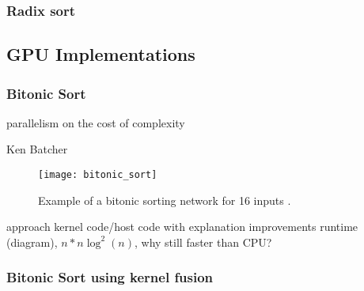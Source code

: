 \subsubsection{Radix sort}




\subsection{GPU Implementations}

\subsubsection{Bitonic Sort}
parallelism on the cost of complexity

Ken Batcher

\begin{figure}
\centering
\texttt{[image: bitonic\_sort]}
\caption{Example of a bitonic sorting network for 16 inputs \cite{wiki_bitonic_sort}.}
\label{fig:bitonic_sort}
\end{figure}

approach
kernel code/host code with explanation
improvements
runtime (diagram), $n * n \log^2(n)$, why still faster than CPU?





\subsubsection{Bitonic Sort using kernel fusion}



